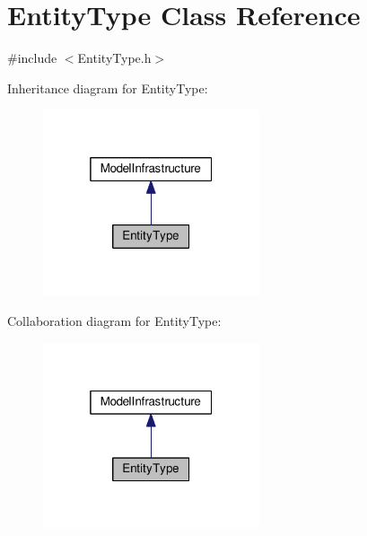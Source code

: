 \hypertarget{class_entity_type}{}\section{Entity\+Type Class Reference}
\label{class_entity_type}


{\ttfamily \#include $<$Entity\+Type.\+h$>$}



Inheritance diagram for Entity\+Type\+:
\nopagebreak
\begin{figure}[H]
\begin{center}
\leavevmode
\includegraphics[width=181pt]{class_entity_type__inherit__graph}
\end{center}
\end{figure}


Collaboration diagram for Entity\+Type\+:
\nopagebreak
\begin{figure}[H]
\begin{center}
\leavevmode
\includegraphics[width=181pt]{class_entity_type__coll__graph}
\end{center}
\end{figure}
